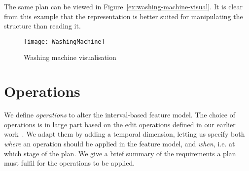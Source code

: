 The same plan can be viewed in Figure~\vref{ex:washing-machine-visual}. It is clear from this example that the representation is better suited for manipulating the structure than reading it. 

\begin{figure}
  \centering
  \texttt{[image: WashingMachine]}
  \caption{Washing machine visualisation}
  \label{ex:washing-machine-visual}
\end{figure}

\section{Operations}
\label{sec:operations}


We define \emph{operations} to alter the interval-based feature model. The choice of operations is in large part based on the edit operations defined in our earlier work~\cite{art:consistency-preserving-evolution-planning}. We adapt them by adding a temporal dimension, letting us specify both \emph{where} an operation should be applied in the feature model, and \emph{when}, i.e. at which stage of the plan. We give a brief summary of the requirements a plan must fulfil for the operations to be applied.

